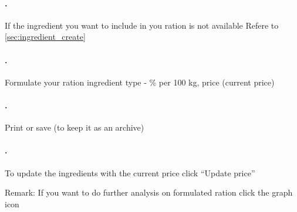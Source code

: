 \paragraph{.} If the ingredient you want to include in you ration is not available Refere to \ref{sec:ingredient_create} 

\paragraph{.}Formulate your ration ingredient type - \% per 100 kg, price (current price)

\paragraph{.} Print or save (to keep it as an archive)

\paragraph{.} To update the ingredients with the current price click “Update price”

Remark: If you want to do further analysis on formulated ration click the graph icon